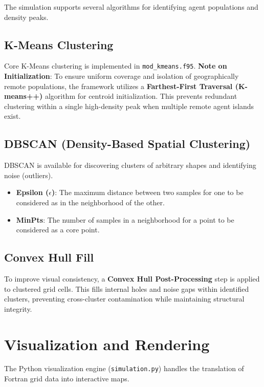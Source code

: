 The simulation supports several algorithms for identifying agent populations and density peaks.

\subsection{K-Means Clustering}
Core K-Means clustering is implemented in \texttt{mod\_kmeans.f95}. 
\textbf{Note on Initialization}: To ensure uniform coverage and isolation of geographically remote populations, the framework utilizes a \textbf{Farthest-First Traversal (K-means++)} algorithm for centroid initialization. This prevents redundant clustering within a single high-density peak when multiple remote agent islands exist.

\subsection{DBSCAN (Density-Based Spatial Clustering)}
DBSCAN is available for discovering clusters of arbitrary shapes and identifying noise (outliers).
\begin{itemize}
    \item \textbf{Epsilon ($\epsilon$)}: The maximum distance between two samples for one to be considered as in the neighborhood of the other.
    \item \textbf{MinPts}: The number of samples in a neighborhood for a point to be considered as a core point.
\end{itemize}

\subsection{Convex Hull Fill}
To improve visual consistency, a \textbf{Convex Hull Post-Processing} step is applied to clustered grid cells. This fills internal holes and noise gaps within identified clusters, preventing cross-cluster contamination while maintaining structural integrity.

\section{Visualization and Rendering}

The Python visualization engine (\texttt{simulation.py}) handles the translation of Fortran grid data into interactive maps.

